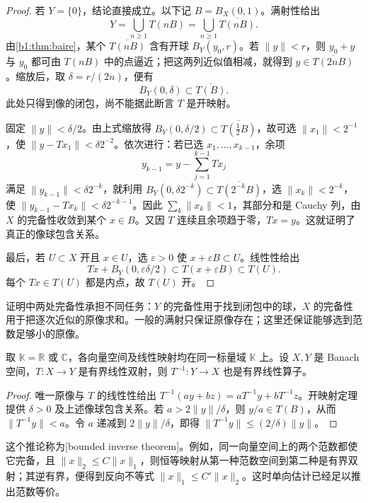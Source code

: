\begin{proof}
若 \(Y=\{0\}\)，结论直接成立。以下记 \(B=B_X(0,1)\)。满射性给出
\[
 Y=\bigcup_{n\ge1}T(nB)
   =\bigcup_{n\ge1}\overline{T(nB)}.
\]
由\cref{b1:thm:baire}，某个 \(\overline{T(nB)}\) 含有开球 \(B_Y(y_0,r)\)。若 \(\|y\|<r\)，则 \(y_0+y\) 与 \(y_0\) 都可由 \(T(nB)\) 中的点逼近；把这两列近似值相减，就得到 \(y\in\overline{T(2nB)}\)。缩放后，取 \(\delta=r/(2n)\)，便有
\[
 B_Y(0,\delta)\subset\overline{T(B)}.
\]
此处只得到像的闭包，尚不能据此断言 \(T\) 是开映射。

固定 \(\|y\|<\delta/2\)。由上式缩放得
\(B_Y(0,\delta/2)\subset\overline{T(\tfrac12B)}\)，故可选 \(\|x_1\|<2^{-1}\)，使 \(\|y-Tx_1\|<\delta2^{-2}\)。依次进行：若已选 \(x_1,\ldots,x_{k-1}\)，余项
\[
 y_{k-1}=y-\sum_{j=1}^{k-1}Tx_j
\]
满足 \(\|y_{k-1}\|<\delta2^{-k}\)，就利用
\(B_Y(0,\delta2^{-k})\subset\overline{T(2^{-k}B)}\)，选 \(\|x_k\|<2^{-k}\)，使 \(\|y_{k-1}-Tx_k\|<\delta2^{-k-1}\)。因此 \(\sum_k\|x_k\|<1\)，其部分和是 Cauchy 列，由 \(X\) 的完备性收敛到某个 \(x\in B\)。又因 \(T\) 连续且余项趋于零，\(Tx=y\)。这就证明了真正的像球包含关系。

最后，若 \(U\subset X\) 开且 \(x\in U\)，选 \(\varepsilon>0\) 使 \(x+\varepsilon B\subset U\)。线性性给出
\[
 Tx+B_Y(0,\varepsilon\delta/2)
 \subset T(x+\varepsilon B)\subset T(U).
\]
每个 \(Tx\in T(U)\) 都是内点，故 \(T(U)\) 开。
\end{proof}

证明中两处完备性承担不同任务：\(Y\) 的完备性用于找到闭包中的球，\(X\) 的完备性用于把逐次近似的原像求和。一般的满射只保证原像存在；这里还保证能够选到范数足够小的原像。

\begin{corollary}[有界逆]
\label{b1:cor:bounded-inverse}
取 \(\mathbb K=\mathbb R\) 或 \(\mathbb C\)，各向量空间及线性映射均在同一标量域 \(\mathbb K\) 上。设 \(X,Y\) 是 Banach 空间，\(T:X\to Y\) 是有界线性双射，则 \(T^{-1}:Y\to X\) 也是有界线性算子。
\end{corollary}

\begin{proof}
唯一原像与 \(T\) 的线性性给出
\(T^{-1}(ay+bz)=aT^{-1}y+bT^{-1}z\)。开映射定理提供 \(\delta>0\) 及上述像球包含关系。若 \(a>2\|y\|/\delta\)，则 \(y/a\in T(B)\)，从而 \(\|T^{-1}y\|<a\)。令 \(a\) 递减到 \(2\|y\|/\delta\)，即得 \(\|T^{-1}y\|\le(2/\delta)\|y\|\)。
\end{proof}

这个推论称为[bounded inverse theorem]。例如，同一向量空间上的两个范数都使它完备，且 \(\|x\|_2\le C\|x\|_1\)，则恒等映射从第一种范数空间到第二种是有界双射；其逆有界，便得到反向不等式 \(\|x\|_1\le C'\|x\|_2\)。这时单向估计已经足以推出范数等价。

